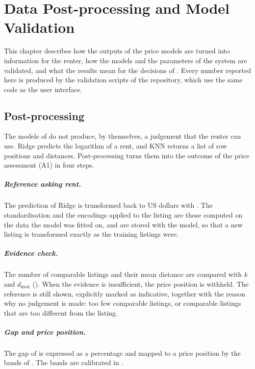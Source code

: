 \documentclass[12pt,a4paper]{report}
\begin{document}
\chapter{Data Post-processing and Model Validation}
\label{ch:validation}

This chapter describes how the outputs of the price models are turned into
information for the renter, how the models and the parameters of the system
are validated, and what the results mean for the decisions of
. Every number reported here is produced by the
validation scripts of the repository, which use the same code as the user
interface.

\section{Post-processing}
\label{sec:postprocessing}

The models of  do not produce, by themselves, a
judgement that the renter can use. Ridge predicts the logarithm of a rent,
and KNN returns a list of row positions and distances. Post-processing turns
them into the outcome of the price assessment (A1) in four steps.

\paragraph{Reference asking rent.} The prediction of Ridge is transformed
back to US dollars with . The standardisation and the
encodings applied to the listing are those computed on the data the model
was fitted on, and are stored with the model, so that a new listing is
transformed exactly as the training listings were.

\paragraph{Evidence check.} The number of comparable listings and their mean
distance are compared with $k$ and $d_{\max}$ (). When
the evidence is insufficient, the price position is withheld. The reference
is still shown, explicitly marked as indicative, together with the reason
why no judgement is made: too few comparable listings, or comparable
listings that are too different from the listing.

\paragraph{Gap and price position.} The gap of  is expressed as
a percentage and mapped to a price position by the bands of
. The bands are calibrated in .
\end{document}
